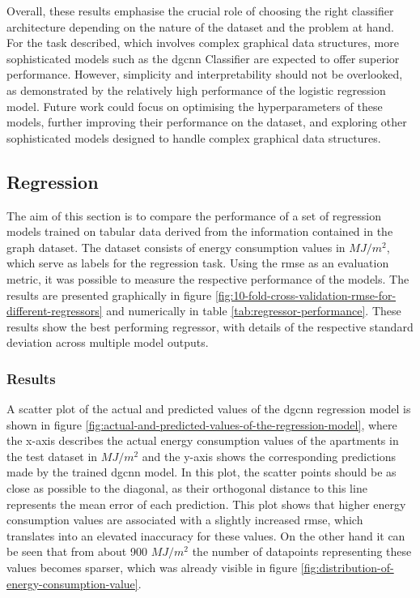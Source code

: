 \documentclass[a4paper, 12pt]{report}
\begin{document}
Overall, these results emphasise the crucial role of choosing the right classifier architecture depending on the nature of the dataset and the problem at hand. For the task described, which involves complex graphical data structures, more sophisticated models such as the \acrshort{dgcnn} Classifier are expected to offer superior performance. However, simplicity and interpretability should not be overlooked, as demonstrated by the relatively high performance of the logistic regression model. Future work could focus on optimising the hyperparameters of these models, further improving their performance on the dataset, and exploring other sophisticated models designed to handle complex graphical data structures.

\subsection{Regression}\label{subsec:regression}

The aim of this section is to compare the performance of a set of regression models trained on tabular data derived from the information contained in the graph dataset. The dataset consists of energy consumption values in $MJ/m^2$, which serve as labels for the regression task. Using the \acrfull{rmse} as an evaluation metric, it was possible to measure the respective performance of the models. The results are presented graphically in figure \ref{fig:10-fold-cross-validation-rmse-for-different-regressors} and numerically in table \ref{tab:regressor-performance}. These results show the best performing regressor, with details of the respective \gls{standard deviation} across multiple model outputs.

\subsubsection{Results}\label{subsubsec:results-regression}

A scatter plot of the actual and predicted values of the \acrshort{dgcnn} regression model is shown in figure \ref{fig:actual-and-predicted-values-of-the-regression-model}, where the x-axis describes the actual energy consumption values of the apartments in the test dataset in $MJ/m^2$ and the y-axis shows the corresponding predictions made by the trained \acrshort{dgcnn} model. In this plot, the scatter points should be as close as possible to the diagonal, as their orthogonal distance to this line represents the mean error of each prediction. This plot shows that higher energy consumption values are associated with a slightly increased \acrshort{rmse}, which translates into an elevated inaccuracy for these values. On the other hand it can be seen that from about 900 $MJ/m^2$ the number of datapoints representing these values becomes sparser, which was already visible in figure \ref{fig:distribution-of-energy-consumption-value}.
\end{document}
